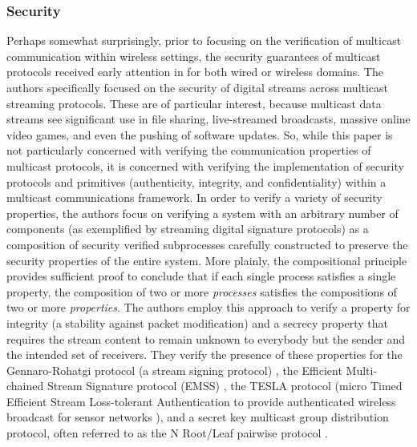 \documentclass[10pt, journal]{IEEEtran}
\begin{document}
\subsubsection{Security}
Perhaps somewhat surprisingly, prior to focusing on the verification of multicast communication within wireless settings, the security guarantees of multicast protocols received early attention in \cite{Gorrieri2008} for both wired or wireless domains. The authors specifically focused on the security of digital streams across multicast streaming protocols. These are of particular interest, because multicast data streams see significant use in file sharing, live-streamed broadcasts, massive online video games, and even the pushing of software updates. So, while this paper is not particularly concerned with verifying the communication properties of multicast protocols, it is concerned with verifying the implementation of security protocols and primitives (authenticity, integrity, and confidentiality) within a multicast communications framework. 
\bigbreak
In order to verify a variety of security properties, the authors focus on verifying a system with an arbitrary number of components (as exemplified by streaming digital signature protocols) as a composition of security verified subprocesses carefully constructed to preserve the security properties of the entire system. More plainly, the compositional principle provides sufficient proof to conclude that if each single process satisfies a single property, the composition of two or more \textit{processes} satisfies the compositions of two or more \textit{properties}. The authors employ this approach to verify a property for integrity (a stability against packet modification) and a secrecy property that requires the stream content to remain unknown to everybody but the sender and the intended set of receivers. They verify the presence of these properties for the Gennaro-Rohatgi protocol (a stream signing protocol) \cite{Gennaro2001}, the Efficient Multi-chained Stream Signature protocol (EMSS) \cite{Perrig2000}, the \textmugreek TESLA protocol (micro Timed Efficient Stream Loss-tolerant Authentication to provide authenticated wireless broadcast for sensor networks \cite{Perrig2002}), and a secret key multicast group distribution protocol, often referred to as the N Root/Leaf pairwise protocol \cite{rfc2627}.
\bigbreak
\end{document}
